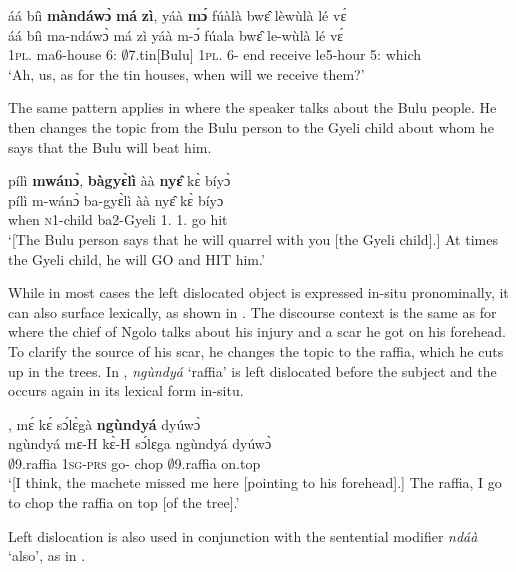 \ea \label{left1}
  \glll     áá bíì {\bfseries màndáwɔ̀} {\bfseries má} {\bfseries zì}, yáà {\bfseries mɔ́} fúàlà bwɛ̂ lèwùlà lé vɛ́\\
          áá bíì ma-ndáwɔ̀ má zì yáà m-ɔ́ fúala bwɛ̂ le-wùlà lé vɛ́\\
              {\EXCL} 1\textsc{pl}.{\OBJ} ma6-house 6:{\ATT} $\emptyset$7.tin[Bulu] 1\textsc{pl}.{\FUT} 6-{\OBJ} end receive le5-hour 5:{\ATT} which\\
    \trans `Ah, us, as for the tin houses, when will we receive them?'
\z

The same pattern applies in  where the speaker talks about the Bulu people. He then changes the topic from the Bulu person to the Gyeli child about whom he says that the Bulu will beat him.

\ea \label{left2}  
  \glll  pílì {\bfseries mwánɔ̀}, {\bfseries bàgyɛ̀lì} àà {\bfseries nyɛ̂} kɛ̀ bíyɔ̀\\
       pílì m-wánɔ̀ ba-gyɛ̀lì àà nyɛ̂ kɛ̀ bíyɔ\\
          when \textsc{n}1-child ba2-Gyeli 1.{\FUT} 1.{\OBJ} go hit\\
    \trans `[The Bulu person says that he will quarrel with you [the Gyeli child].] At times the Gyeli child, he will GO and HIT him.'
\z

\noindent While in most cases the left dislocated object is expressed in-situ pronominally, it can also surface lexically, as shown in . The discourse context is the same as for  where the chief of Ngolo talks about his injury and a scar he got on his forehead. To clarify the source of his scar, he changes the topic to the raffia, which he cuts up in the trees. In , {\itshape ngùndyá} `raffia' is left dislocated before the subject and the occurs again in its lexical form in-situ.

\ea \label{left3}
  , mɛ́ kɛ́ sɔ́lɛ̀gà {\bfseries ngùndyá} dyúwɔ̀\\
          ngùndyá mɛ-H kɛ̀-H sɔ́lɛga ngùndyá dyúwɔ̀\\
              $\emptyset$9.raffia 1\textsc{sg}-\textsc{prs} go-{\R} chop $\emptyset$9.raffia on.top\\
    \trans `[I think, the machete missed me here [pointing to his forehead].] The raffia, I go to chop the raffia on top [of the tree].'
\z

Left dislocation is also used in conjunction with the sentential modifier {\itshape ndáà} `also', as in .

